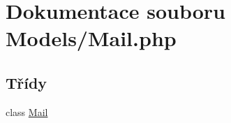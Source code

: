 \hypertarget{_mail_8php}{\section{Dokumentace souboru Models/\-Mail.php}
\label{_mail_8php}
}
\subsection*{Třídy}
\begin{DoxyCompactItemize}
\item 
class \hyperlink{class_mail}{Mail}
\end{DoxyCompactItemize}
